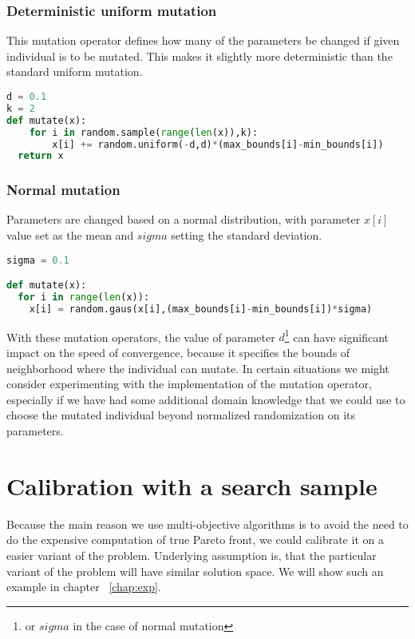 \documentclass[12pt,oneside]{fithesis2}
\begin{document}
\subsubsection{Deterministic uniform mutation}
This mutation operator defines how many of the parameters be changed if given individual is to be mutated. This makes it  slightly more deterministic than the standard uniform mutation.
\begin{lstlisting}[language=Python,label=mutate_example,caption=Deterministic uniform mutation example]
d = 0.1
k = 2
def mutate(x):
    for i in random.sample(range(len(x)),k):
        x[i] += random.uniform(-d,d)*(max_bounds[i]-min_bounds[i])
  return x
\end{lstlisting}

\subsubsection{Normal mutation}
Parameters are changed based on a normal distribution, with parameter $x[i]$ value set as the mean and $sigma$ setting the standard deviation.
\begin{lstlisting}[language=Python,label=mutate_example,caption=Normal mutation example]
sigma = 0.1

def mutate(x):
  for i in range(len(x)):
    x[i] = random.gaus(x[i],(max_bounds[i]-min_bounds[i])*sigma)
\end{lstlisting}

With these mutation operators, the value of parameter $d$\footnote{or $sigma$ in the case of normal mutation} can have significant impact on the speed of convergence, because it specifies the bounds of neighborhood where the individual can mutate. In certain situations we might consider experimenting with the implementation of the mutation operator, especially if we have had some additional domain knowledge that we could use to choose the mutated individual beyond normalized randomization on its parameters.

\section{Calibration with a search sample}
Because the main reason we use multi-objective algorithms is to avoid the need to do the expensive computation of true Pareto front, we could calibrate it on a easier variant of the problem. Underlying assumption is, that the particular variant of the problem will have similar solution space. We will show such an example in chapter ~\ref{chap:exp}.
\end{document}
